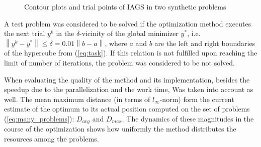 \documentclass[runningheads]{llncs}
\begin{document}
\begin{figure}[ht]
    \centering
    \caption{Contour plots and trial points of IAGS in two synthetic problems}
    \label{fig:isolines}
\end{figure}

A test problem was considered to be solved if the optimization method executes the next trial
\(y^k\) in the \(\delta\)-vicinity of the global minimizer \(y^*\), i.e.
\(\left\|y^k-y^*\right\|\leqslant \delta = 0.01\left\|b-a\right\|\), 
where \(a\) and \(b\) are the left and right boundaries of the hypercube from (\ref{eq:task}).
If this relation is not fulfilled upon reaching the limit of number of iterations, the problem was
considered to be not solved.

When evaluating the quality of the method and its implementation, besides the speedup due to
the parallelization and the work time,
Was taken into account as well.
The mean maximum distance (in terms of \(l_{\infty}\)-norm) form the current estimate of the
optimum to its actual position computed on the set of problems (\ref{eq:many_problems}):
\(D_{avg}\) and \(D_{max}\).
The dynamics of these magnitudes in the course of the optimization shows how uniformly the
method distributes the resources among the problems.
\end{document}
